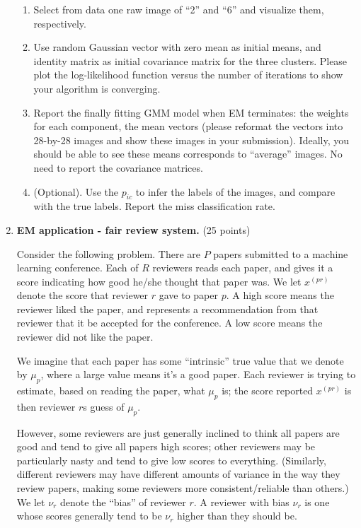 \documentclass[11pt]{article}
\begin{document}
\begin{enumerate}
\begin{enumerate}

\item Select from data one raw image of ``2'' and ``6'' and visualize them, respectively. 

\item Use random Gaussian vector with zero mean as initial means, and identity matrix as initial covariance matrix for the three clusters. Please plot the log-likelihood function versus the number of iterations to show your algorithm is converging.

\item  Report the finally fitting GMM model when EM terminates: the weights for each component, the mean vectors (please reformat the vectors into 28-by-28 images and show these images in your submission). Ideally, you should be able to see these means corresponds to ``average'' images.  No need to report the covariance matrices. 

\item (Optional). Use the $p_{ic}$ to infer the labels of the images, and compare with the true labels. Report the miss classification rate.  


\end{enumerate}



\item {\bf EM application - fair review system.} (25 points)

Consider the following problem. There are $P$ papers submitted to a machine learning conference. Each of $R$ reviewers reads each paper, and gives it a score indicating how good he/she thought that paper was. We let $x^{(pr)}$ denote the score that reviewer $r$ gave to paper $p$. A high score means the reviewer liked the paper, and represents a recommendation from that reviewer that it be accepted for the conference. A low score means the reviewer did not like the paper.

We imagine that each paper has some ``intrinsic'' true value that we denote by $\mu_p$, where a large value means it's a good paper. Each reviewer is trying to estimate, based on reading the paper, what $\mu_p$ is; the score reported $x^{(pr)}$ is then reviewer $r$s guess of $\mu_p$.

However, some reviewers are just generally inclined to think all papers are good and tend to give all papers high scores; other reviewers may be particularly nasty and tend to give low scores to everything. (Similarly, different reviewers may have different amounts of variance in the way they review papers, making some reviewers more consistent/reliable than others.) We let $\nu_r$ denote the ``bias'' of reviewer $r$. A reviewer with bias $\nu_r$ is one whose scores generally tend to be $\nu_r$ higher than they should be.


\end{enumerate}
\end{document}
